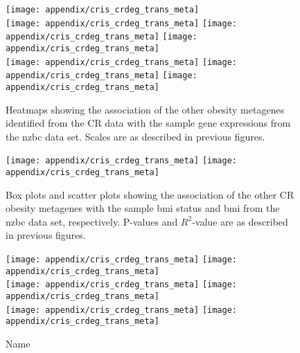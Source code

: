 \begin{appendices}
	\begin{figure}[htp!]
		\centering
		\texttt{[image: appendix/cris\_crdeg\_trans\_meta]}\\
		\texttt{[image: appendix/cris\_crdeg\_trans\_meta]}
		\texttt{[image: appendix/cris\_crdeg\_trans\_meta]}
		\texttt{[image: appendix/cris\_crdeg\_trans\_meta]}\\
		\texttt{[image: appendix/cris\_crdeg\_trans\_meta]}
		\texttt{[image: appendix/cris\_crdeg\_trans\_meta]}
		\texttt{[image: appendix/cris\_crdeg\_trans\_meta]}\\
		\caption[Association of the other CR obesity metagenes with the sample gene expressions in the \gls{nzbc} data]{Heatmaps showing the association of the other obesity metagenes identified from the CR data with the sample gene expressions from the \gls{nzbc} data set.
		Scales are as described in previous figures.}
		\label{fig:appendix/cr_ob_meta_heatmap_cris}
	\end{figure}

	\begin{figure}[htpb]
		\centering
		\texttt{[image: appendix/cris\_crdeg\_trans\_meta]}
		\hfill
		\texttt{[image: appendix/cris\_crdeg\_trans\_meta]}\\
		\caption[Association of the other CR obesity metagenes with the sample \gls{bmi}/\gls{bmi} status in the \gls{nzbc} data]{Box plots and scatter plots showing the association of the other CR obesity metagenes with the sample \gls{bmi} status  and \gls{bmi} from the \gls{nzbc} data set, respectively.
		P-values and $R^2$-value are as described in previous figures.}
		\label{fig:appendix/cr_ob_meta_box_scatter_cris}
	\end{figure}

	\begin{figure}[htpb]
		\ContinuedFloat
		\captionsetup{list=off,format=cont}
		\centering
		\texttt{[image: appendix/cris\_crdeg\_trans\_meta]}
		\hfill
		\texttt{[image: appendix/cris\_crdeg\_trans\_meta]}\\
		\texttt{[image: appendix/cris\_crdeg\_trans\_meta]}
		\hfill
		\texttt{[image: appendix/cris\_crdeg\_trans\_meta]}\\
		\texttt{[image: appendix/cris\_crdeg\_trans\_meta]}
		\hfill
		\texttt{[image: appendix/cris\_crdeg\_trans\_meta]}\\
		\caption{Name}
	\end{figure}


\end{appendices}
